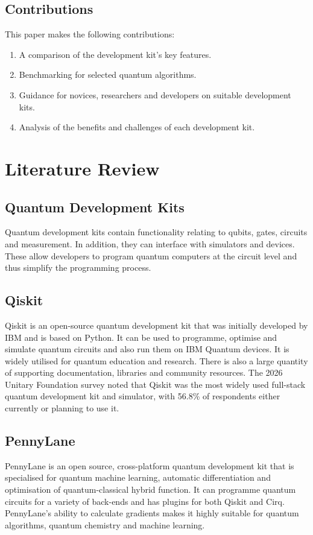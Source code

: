 \documentclass[journal]{IEEEtran}
\begin{document}
\subsection{Contributions}
This paper makes the following contributions:
\begin{enumerate}
\item A comparison of the development kit's key features.
\item Benchmarking for selected quantum algorithms.
\item Guidance for novices, researchers and developers on suitable development kits.
\item Analysis of the benefits and challenges of each development kit.
\end{enumerate}

\section{Literature Review}

\subsection{Quantum Development Kits}
Quantum development kits contain functionality relating to qubits, gates, circuits and measurement. In addition, they can interface with simulators and devices. These allow developers to program quantum computers at the circuit level and thus simplify the programming process.

\subsection{Qiskit}
Qiskit is an open-source quantum development kit that was initially developed by IBM and is based on Python. It can be used to programme, optimise and simulate quantum circuits and also run them on IBM Quantum devices. It is widely utilised for quantum education and research. There is also a large quantity of supporting documentation, libraries and community resources. The 2026 Unitary Foundation survey noted that Qiskit was the most widely used full-stack quantum development kit and simulator, with 56.8\% of respondents either currently or planning to use it.

\subsection{PennyLane}
PennyLane is an open source, cross-platform quantum development kit that is specialised for quantum machine learning, automatic differentiation and optimisation of quantum-classical hybrid function. It can programme quantum circuits for a variety of back-ends and has plugins for both Qiskit and Cirq. PennyLane's ability to calculate gradients makes it highly suitable for quantum algorithms, quantum chemistry and machine learning.
\end{document}
